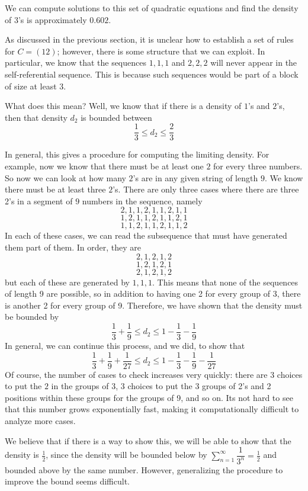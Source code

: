 \documentclass[runningheads,a4paper]{llncs}
\begin{document}
We can compute solutions to this set of quadratic equations and find the density of 3's is approximately $0.602$.

As discussed in the previous section, it is unclear how to establish a set of rules for $C = (1 2)$; however, there is some structure that we can exploit. In particular, we know that the sequences $1, 1, 1$ and $2, 2, 2$ will never appear in the self-referential sequence. This is because such sequences would be part of a block of size at least $3$. 

What does this mean? Well, we know that if there is a density of $1$'s and $2$'s, then that density $d_2$ is bounded between 
\[ \dfrac{1}{3} \leq d_2 \leq \dfrac{2}{3} \]

In general, this gives a procedure for computing the limiting density. For example, now we know that there must be at least one $2$ for every three numbers. So now we can look at how many $2$'s are in any given string of length $9$. We know there must be at least three $2$'s. There are only three cases where there are three 2's in a segment of $9$ numbers in the sequence, namely
\[ 2, 1, 1, 2, 1, 1 ,2 , 1, 1 \]
\[ 1, 2, 1, 1, 2, 1, 1, 2, 1 \]
\[ 1, 1, 2, 1, 1, 2, 1, 1, 2 \]
In each of these cases, we can read the subsequence that must have generated them part of them. In order, they are
\[ 2, 1, 2, 1, 2 \]
\[ 1, 2, 1, 2, 1\]
\[ 2, 1, 2, 1, 2 \]
but each of these are generated by $1, 1, 1$. This means that none of the sequences of length 9 are possible, so in addition to having one 2 for every group of 3, there is another 2 for every group of 9. Therefore, we have shown that the density must be bounded by
\[ \dfrac{1}{3} + \dfrac{1}{9} \leq d_2 \leq 1 - \dfrac{1}{3} - \dfrac{1}{9} \]
In general, we can continue this process, and we did, to show that
\[ \dfrac{1}{3} + \dfrac{1}{9} + \dfrac{1}{27} \leq d_2 \leq 1 - \dfrac{1}{3} - \dfrac{1}{9} - \dfrac{1}{27} \]
Of course, the number of cases to check increases very quickly: there are $3$ choices to put the $2$ in the groups of $3$, $3$ choices to put the 3 groups of 2's and 2 positions within these groups for the groups of 9, and so on. Its not hard to see that this number grows exponentially fast, making it computationally difficult to analyze more cases.

We believe that if there is a way to show this, we will be able to show that the density is $\frac{1}{2}$, since the density will be bounded below by $\sum_{n=1}^\infty \dfrac{1}{3^n} = \frac{1}{2}$ and bounded above by the same number. However, generalizing the procedure to improve the bound seems difficult.
\end{document}
